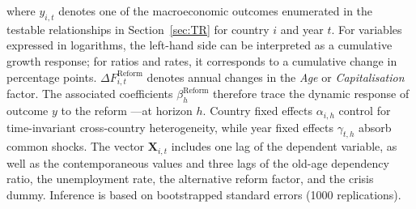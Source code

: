 \documentclass[11pt,english,a4paper, twoside, authoryear]{article}
\begin{document}
\noindent where $y_{i,t}$ denotes one of the macroeconomic outcomes enumerated in the testable relationships in Section~\ref{sec:TR} for country $i$ and year $t$. For variables expressed in logarithms, the left-hand side can be interpreted as a cumulative growth response; for ratios and rates, it corresponds to a cumulative change in percentage points. $\Delta F^{\text{Reform}}_{i,t}$ denotes annual changes in the \emph{Age} or \emph{Capitalisation} factor. The associated coefficients $\beta^{\text{Reform}}_h$ therefore trace the dynamic response of outcome $y$ to the reform ---at horizon $h$.
Country fixed effects $\alpha_{i,h}$ control for time-invariant cross-country heterogeneity, while year fixed effects $\gamma_{t,h}$ absorb common shocks. The vector $\mathbf{X}_{i,t}$ includes one lag of the dependent variable, as well as the contemporaneous values and three lags of the old-age dependency ratio, the unemployment rate, the alternative reform factor, and the crisis dummy. Inference is based on bootstrapped standard errors (1000 replications).
\end{document}
